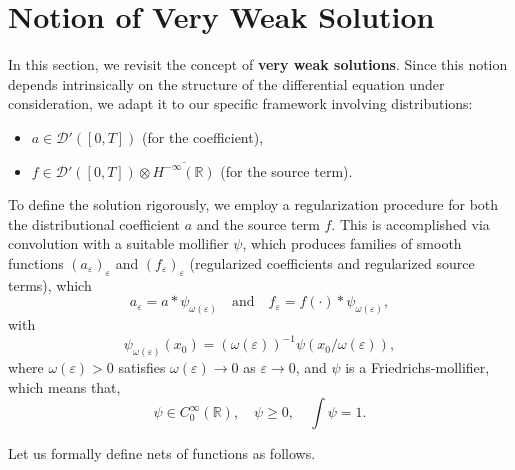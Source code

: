 \documentclass[12pt]{amsart}
\theoremstyle{definition}
\begin{document}
\section{Notion of Very Weak Solution}

In this section, we revisit the concept of \textbf{very weak solutions}. Since this notion depends intrinsically on the structure of the differential equation under consideration, we adapt it to our specific framework involving distributions:
\begin{itemize}
    \item $a \in \mathcal{D}'([0, T])$ (for the coefficient),
    \item $f \in \mathcal{D}'([0, T]) \otimes \overline{H^{-\infty}(\mathbb{R})}$ (for the source term).
\end{itemize}

To define the solution rigorously, we employ a regularization procedure for both the distributional coefficient $a$ and the source term $f$. This is accomplished via convolution with a suitable mollifier $\psi$, which produces families of smooth functions $(a_\varepsilon)_\varepsilon$ and $(f_\varepsilon)_\varepsilon$ (regularized coefficients and regularized source terms), which
\begin{equation}
\label{eq1.7}
a_\varepsilon = a * \psi_{\omega(\varepsilon)} \quad \text{and} \quad f_\varepsilon = f(\cdot) * \psi_{\omega(\varepsilon)},
\end{equation}
with
\[
\psi_{\omega(\varepsilon)}(x_0) = (\omega(\varepsilon))^{-1} \psi(x_0 / \omega(\varepsilon)),
\]
where $\omega(\varepsilon) > 0$ satisfies  $\omega(\varepsilon) \to 0$ as $\varepsilon \to 0$, and $\psi$ is a Friedrichs-mollifier, which means that,
\[
\psi \in C_0^\infty(\mathbb{R}), \quad \psi \geq 0, \quad \int \psi = 1.
\]

Let us formally define nets of functions as follows.
\end{document}

